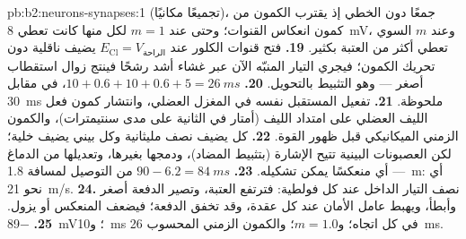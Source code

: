\begin{solution}{pb:b2:neurons-synapses:1}
(تجميعًا مكانيًا)، جمعًا دون الخطي إذ يقترب الكمون من
كمون انعكاس القنوات؛ وحتى عند $m = 1$ لكل منها كانت
تعطي \qty{8}{mV}، وعند $m$ السوي تعطي أكثر من العتبة بكثير.
\textbf{19.} فتح قنوات الكلور عند $E_{\mathrm{Cl}} = V_{\text{الراحة}}$
يضيف ناقلية دون تحريك الكمون؛ فيجري التيار
المنبّه الآن عبر غشاء أشد رشحًا فينتج زوال استقطاب
أصغر --- وهو التثبيط بالتحويل.
\textbf{20.} $10 + 0.6 + 10 + 0.6 + 5 = \qty{26}{ms}$، في مقابل
\qty{30}{ms} ملحوظة.
\textbf{21.} تفعيل المستقبل نفسه في المغزل العضلي،
وانتشار كمون فعل الليف العضلي على امتداد الليف
(أمتار في الثانية على مدى سنتيمترات)، والكمون الزمني الميكانيكي
قبل ظهور القوة.
\textbf{22.} كل  يضيف نصف مليثانية وكل  بيني
يضيف خلية؛ لكن العصبونات البينية تتيح  الإشارة
(بتثبيط المضاد)، ودمجها بغيرها، وتعديلها من
الدماغ --- أي منعكسًا يمكن تشكيله.
\textbf{23.} $90 - 6.2 = \qty{84}{ms}$ من التوصيل لمسافة \qty{1.8}{m}:
أي نحو \qty{21}{m/s}.
\textbf{24.} نصف التيار الداخل عند كل فولطية: فترتفع العتبة،
وتصير الدفعة أصغر وأبطأ، ويهبط عامل الأمان عند كل
عقدة، وقد تخفق الدفعة؛ فيضعف المنعكس أو
يزول.
\textbf{25.}  \qty{-89}{mV}؛ و\qty{10}{ms} في كل اتجاه؛
و$m = 1.0$؛ والكمون الزمني المحسوب \qty{26}{ms}.
\end{solution}
